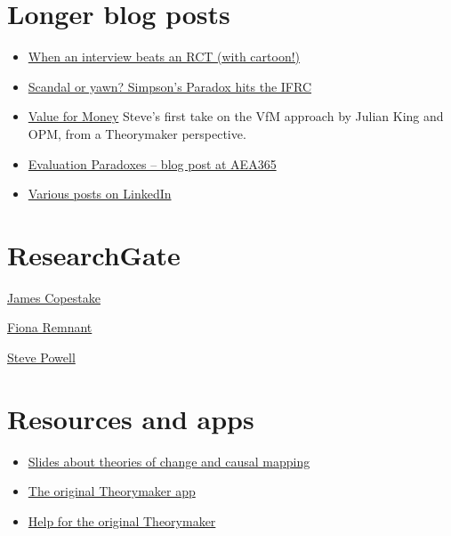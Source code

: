 \documentclass[
]{book}
\providecommand{\tightlist}{%
  \setlength{\itemsep}{0pt}\setlength{\parskip}{0pt}}
\begin{document}
\hypertarget{longer-blog-posts}{%
\section{Longer blog posts}\label{longer-blog-posts}}

\begin{itemize}
\tightlist
\item
  \href{http://www.pogol.net/public/article-evidence.html}{When an interview beats an RCT (with cartoon!)}
\item
  \href{http://www.pogol.net/_ideas/posts/2019-01-14-scandal-or-yawn-simpsons-paradox-hits-the-ifrc/}{Scandal or yawn? Simpson's Paradox hits the IFRC}
\item
  \href{http://pogol.net/public/article-equity.html}{Value for Money} Steve's first take on the VfM approach by Julian King and OPM, from a Theorymaker perspective.
\item
  \href{https://aea365.org/blog/theories-of-eval-tig-week-evaluation-paradoxes-by-steve-powell/}{Evaluation Paradoxes -- blog post at AEA365}
\item
  \href{https://www.linkedin.com/in/stevepowell99/detail/recent-activity/posts/}{Various posts on LinkedIn}
\end{itemize}

\hypertarget{researchgate}{%
\section{ResearchGate}\label{researchgate}}

\href{https://www.researchgate.net/profile/James_Copestake}{James Copestake}

\href{https://www.researchgate.net/profile/Fiona_Remnant}{Fiona Remnant}

\href{https://www.researchgate.net/profile/Steve_Powell2}{Steve Powell}

\hypertarget{resources-and-apps}{%
\section{Resources and apps}\label{resources-and-apps}}

\begin{itemize}
\tightlist
\item
  \href{http://slides.theorymaker.info/}{Slides about theories of change and causal mapping}
\item
  \href{http://www.pogol.net/_causal_mapping/theorymaker.info}{The original Theorymaker app}
\item
  \href{http://help.theorymaker.info/}{Help for the original Theorymaker}
\end{itemize}
\end{document}
